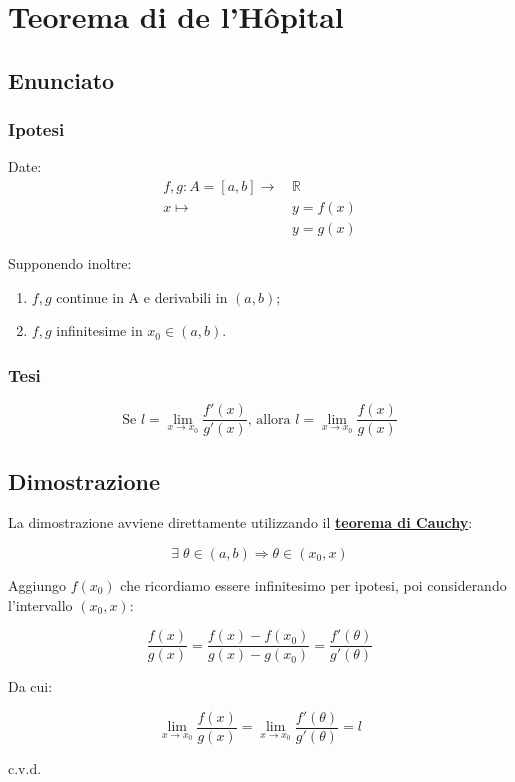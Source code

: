 \documentclass[../../dimostrazioni]{subfiles}
\begin{document}
    \chapter{Teorema di de l'Hôpital}
    \label{teoHopital}

        \section*{Enunciato}

            \subsection*{Ipotesi}

                Date:
                \begin{align*}
                    f,g : A = [a, b] \longrightarrow \, &\mathbb{R}\\
                    x \longmapsto \, &y = f(x)\\
                                  &y = g(x) 
                \end{align*}

                Supponendo inoltre: 

                \begin{enumerate}
                    \indentitem \item \(f, g\) continue in A e derivabili in \( (a,b) \);
                    \indentitem \item \(f, g\) infinitesime in \(x_0 \in (a,b)\).
                \end{enumerate}

            \subsection*{Tesi}

                \[ 
                    \text{Se } l = \lim_{x \to x_0} \frac{f'(x)}{g'(x)} \text{, allora } l = \lim_{x \to x_0} \frac{f(x)}{g(x)}
                \]

        \section*{Dimostrazione}

            La dimostrazione avviene direttamente utilizzando il \textbf{\hyperref[teoCauchy]{teorema di Cauchy}}:

            \[ \exists \; \theta \in (a,b) \Rightarrow \theta \in (x_0, x) \]

            Aggiungo \(f(x_0)\) che ricordiamo essere infinitesimo per ipotesi, poi considerando l'intervallo \((x_0, x)\):

            \[  \frac{f(x)}{g(x)} = \frac{f(x) - f(x_0)}{g(x) - g(x_0)} = \frac{f'(\theta)}{g'(\theta)} \]

            Da cui:
            
            \[  \lim_{x \to x_0} \frac{f(x)}{g(x)} = \lim_{x \to x_0} \frac{f'(\theta)}{g'(\theta)} = l \]
            
            c.v.d.
\end{document}

